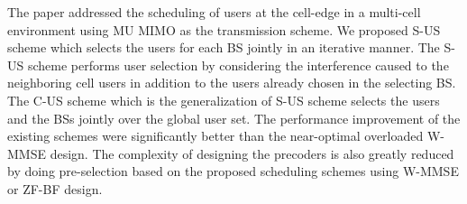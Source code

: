 
The paper addressed the scheduling of users at the cell-edge in a multi-cell environment using \ac{MU} \ac{MIMO} as the transmission scheme. We proposed \ac{S-US} scheme which selects the users for each \ac{BS} jointly in an iterative manner. The \ac{S-US} scheme performs user selection by considering the interference caused to the neighboring cell users in addition to the users already chosen in the selecting \ac{BS}. The \ac{C-US} scheme which is the generalization of \ac{S-US} scheme selects the users and the \ac{BS}s jointly over the global user set. The performance improvement of the existing schemes were significantly better than the near-optimal overloaded \ac{W-MMSE} design. The complexity of designing the precoders is also greatly reduced by doing pre-selection based on the proposed scheduling schemes using
\ac{W-MMSE} or \ac{ZF}-\ac{BF} design.


